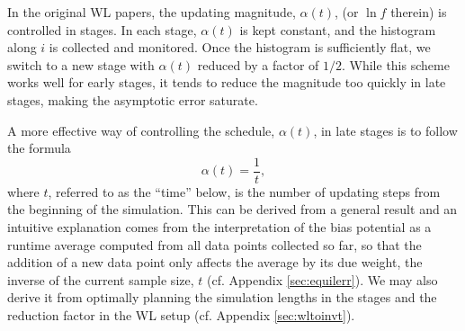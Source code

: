 \documentclass[reprint, superscriptaddress, floatfix]{revtex4-1}
\begin{document}
In the original WL papers\cite{
wang2001, *wang2001pre},
the updating magnitude, $\alpha(t)$,
(or $\ln f$ therein)
is controlled in stages.
%
In each stage, $\alpha(t)$
is kept constant,
and the histogram along $i$
is collected and monitored.
%
Once the histogram is sufficiently flat,
we switch to a new stage
with $\alpha(t)$ reduced by a factor of $1/2$\cite{
wang2001, *wang2001pre}.
%
While this scheme works well for early stages,
it tends to reduce the magnitude
too quickly in late stages, making the asymptotic error
saturate\cite{
belardinelli2007, *belardinelli2007jcp, *belardinelli2008, *belardinelli2016}.


A more effective way
of controlling the schedule, $\alpha(t)$,
in late stages
is to follow the formula
%
\begin{equation}
  \alpha(t) = \frac{1}{t},
  \label{eq:alpha_invt}
\end{equation}
%
where $t$,
referred to as the ``time'' below,
is the number of updating steps
from the beginning of the simulation\cite{
belardinelli2007, *belardinelli2007jcp, *belardinelli2008, *belardinelli2016,
morozov2007, zhou2008,
komura2012, *caparica2012, *caparica2014}.
%
This can be derived from a general result\cite{
  robbins1951, pellegrini2014}
and an intuitive explanation\cite{
  marsili2006, barducci2008}
comes from the interpretation of
the bias potential %
as a runtime average computed from all data points collected so far,
so that the addition of a new data point only
affects the average by its due weight,
the inverse of the current sample size, $t$
(cf. Appendix \ref{sec:equilerr}).
%
We may also derive it
from optimally planning the simulation lengths in the stages
and the reduction factor in the WL setup (cf. Appendix \ref{sec:wltoinvt}).

%


\end{document}
